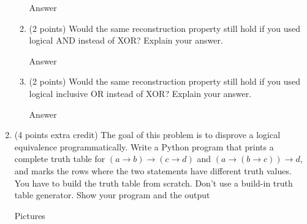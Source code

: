 \documentclass{article}
\begin{document}
\begin{enumerate}
\begin{enumerate}
        \color{blue}
            Answer
        \color{black}
        
        \item  (2 points) Would the same reconstruction property still hold if you used logical AND instead of XOR? Explain your answer.

        \color{blue}
            Answer
        \color{black}
        
        \item  (2 points) Would the same reconstruction property still hold if you used logical inclusive OR instead of XOR? Explain your answer.

        \color{blue}
            Answer
        \color{black}
        
    \end{enumerate}

    \item (4 points extra credit) The goal of this problem is to disprove a logical equivalence programmatically. Write a Python program that prints a complete truth table for $(a \rightarrow b) \rightarrow (c \rightarrow d)$ and $(a \rightarrow (b \rightarrow c)) \rightarrow d$, and marks the rows where the two statements have different truth values. You have to build the truth table from scratch. Don’t use a build-in truth table generator. Show your program and the output
    
    \color{blue}
    \begin{center}
        Pictures
    \end{center}
    \color{black}
    
\end{enumerate}
\end{document}
